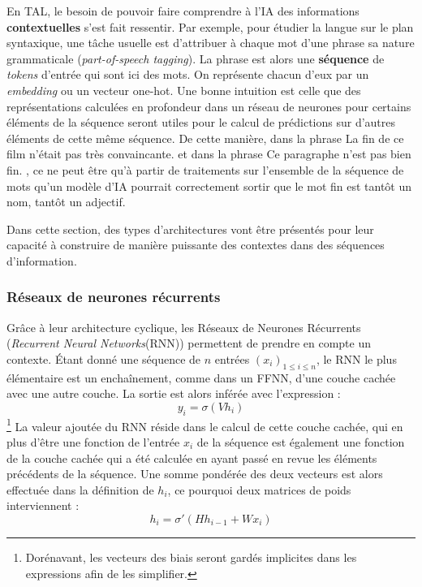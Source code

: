 \documentclass[12pt, french, twoside]{report}
\begin{document}
En TAL, le besoin de pouvoir faire comprendre à l'IA des informations \textbf{contextuelles} s'est fait ressentir. Par exemple, pour étudier la langue sur le plan syntaxique, une tâche usuelle est d'attribuer à chaque mot d'une phrase sa nature grammaticale (\textit{part-of-speech tagging}). La phrase est alors une \textbf{séquence} de \textit{tokens} d'entrée qui sont ici des mots. On représente chacun d'eux par un \textit{embedding} ou un vecteur one-hot. Une bonne intuition est celle que des représentations calculées en profondeur dans un réseau de neurones pour certains éléments de la séquence seront utiles pour le calcul de prédictions sur d'autres éléments de cette même séquence. De cette manière, dans la phrase \og La fin de ce film n'était pas très convaincante. \fg{} et dans la phrase \og Ce paragraphe n'est pas bien fin. \fg, ce ne peut être qu'à partir de traitements sur l'ensemble de la séquence de mots qu'un modèle d'IA pourrait correctement sortir que le mot \og fin \fg  est tantôt un nom, tantôt un adjectif.

Dans cette section, des types d'architectures vont être présentés pour leur capacité à construire de manière puissante des contextes dans des séquences d'information.
\subsubsection{Réseaux de neurones récurrents}

Grâce à leur architecture cyclique, les Réseaux de Neurones Récurrents (\textit{Recurrent Neural Networks}(RNN)) permettent de prendre en compte un contexte. Étant donné une séquence de $n$ entrées $(x_i)_{1\leq i \leq n}$, le RNN le plus élémentaire est un enchaînement, comme dans un FFNN, d'une couche cachée avec une autre couche. La sortie est alors inférée avec l'expression :
\begin{equation}
    y_i = \sigma(Vh_i)
\end{equation}\footnote{Dorénavant, les vecteurs des biais seront gardés implicites dans les expressions afin de les simplifier.}
La valeur ajoutée du RNN réside dans le calcul de cette couche cachée, qui en plus d'être une fonction de l'entrée $x_i$ de la séquence est également une fonction de la couche cachée qui a été calculée en ayant passé en revue les éléments précédents de la séquence. Une somme pondérée des deux vecteurs est alors effectuée dans la définition de $h_i$, ce pourquoi deux matrices de poids interviennent :
\begin{equation}
    h_i = \sigma'(Hh_{i-1} + Wx_i)
\end{equation}
\end{document}
